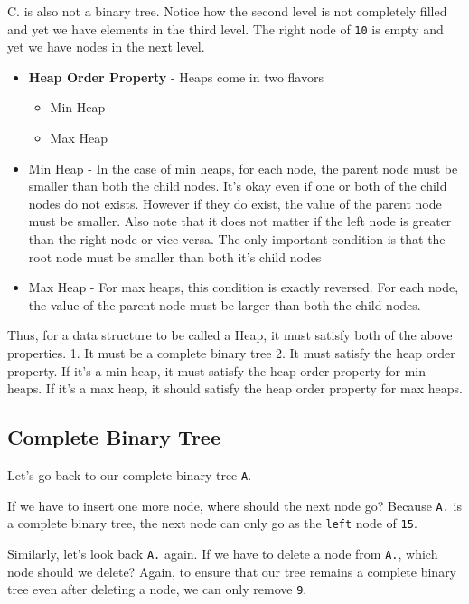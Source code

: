 \documentclass[11pt]{article}
\providecommand{\tightlist}{%
      \setlength{\itemsep}{0pt}\setlength{\parskip}{0pt}}
\begin{document}
 C. is also not a binary tree. Notice how the second level is not
completely filled and yet we have elements in the third level. The right
node of \texttt{10} is empty and yet we have nodes in the next level.

    \begin{itemize}
\tightlist
\item
  \textbf{Heap Order Property} - Heaps come in two flavors

  \begin{itemize}
  \tightlist
  \item
    Min Heap
  \item
    Max Heap
  \end{itemize}
\item
  Min Heap - In the case of min heaps, for each node, the parent node
  must be smaller than both the child nodes. It's okay even if one or
  both of the child nodes do not exists. However if they do exist, the
  value of the parent node must be smaller. Also note that it does not
  matter if the left node is greater than the right node or vice versa.
  The only important condition is that the root node must be smaller
  than both it's child nodes
\item
  Max Heap - For max heaps, this condition is exactly reversed. For each
  node, the value of the parent node must be larger than both the child
  nodes.
\end{itemize}

Thus, for a data structure to be called a Heap, it must satisfy both of
the above properties. 1. It must be a complete binary tree 2. It must
satisfy the heap order property. If it's a min heap, it must satisfy the
heap order property for min heaps. If it's a max heap, it should satisfy
the heap order property for max heaps.

    \subsection{Complete Binary Tree}\label{complete-binary-tree}

Let's go back to our complete binary tree \texttt{A}.

If we have to insert one more node, where should the next node go?
Because \texttt{A.} is a complete binary tree, the next node can only go
as the \texttt{left} node of \texttt{15}.

Similarly, let's look back \texttt{A.} again. If we have to delete a
node from \texttt{A.}, which node should we delete? Again, to ensure
that our tree remains a complete binary tree even after deleting a node,
we can only remove \texttt{9}.
\end{document}
